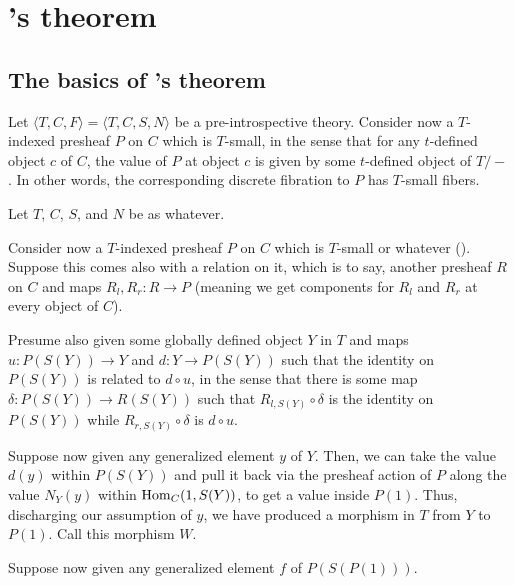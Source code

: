 \section{\Loeb's theorem}


\subsection{The basics of \Loeb's theorem}
Let $\langle T, C, F \rangle = \langle T, C, S, N \rangle$ be a pre-introspective theory. Consider now a $T$-indexed presheaf $P$ on $C$ which is $T$-small, in the sense that for any $t$-defined object $c$ of $C$, the value of $P$ at object $c$ is given by some $t$-defined object of $T/-$. In other words, the corresponding discrete fibration to $P$ has $T$-small fibers.

 Let $T$, $C$, $S$, and $N$ be as whatever.

Consider now a $T$-indexed presheaf $P$ on $C$ which is $T$-small or whatever (\TODO). Suppose this comes also with a relation on it, which is to say, another presheaf $R$ on $C$ and maps $R_l, R_r : R \to P$ (meaning we get components for $R_l$ and $R_r$ at every object of $C$).

Presume also given some globally defined object $Y$ in $T$ and maps $u: P(S(Y)) \to Y$ and $d : Y \to P(S(Y))$ such that the identity on $P(S(Y))$ is related to $d \circ u$, in the sense that there is some map $\delta : P(S(Y)) \to R(S(Y))$ such that $R_{l, S(Y)} \circ \delta$ is the identity on $P(S(Y))$ while $R_{r, S(Y)} \circ \delta$ is $d \circ u$.

Suppose now given any generalized element $y$ of $Y$. Then, we can take the value $d(y)$ within $P(S(Y))$ and pull it back via the presheaf action of $P$ along the value $N_Y(y)$ within $\operatorname{Hom}_C(1, S(Y))$, to get a value inside $P(1)$. Thus, discharging our assumption of $y$, we have produced a morphism in $T$ from $Y$ to $P(1)$. Call this morphism $W$.

Suppose now given any generalized element $f$ of $P(S(P(1)))$.

